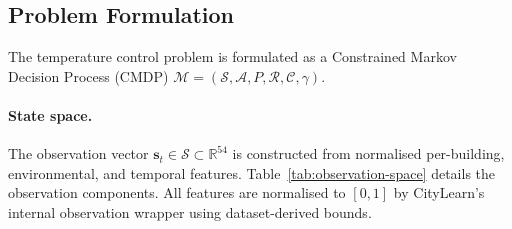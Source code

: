 \subsection{Problem Formulation}
\label{sec:temp-formulation}

The temperature control problem is formulated as a Constrained Markov Decision
Process (CMDP) $\mathcal{M} = (\mathcal{S}, \mathcal{A}, P, \mathcal{R},
\mathcal{C}, \gamma)$.

\paragraph{State space.}
The observation vector $\mathbf{s}_t \in \mathcal{S} \subset \mathbb{R}^{54}$
is constructed from normalised per-building, environmental, and temporal
features.  Table~\ref{tab:observation-space} details the observation
components.  All features are normalised to $[0, 1]$ by CityLearn's internal
observation wrapper using dataset-derived bounds.

